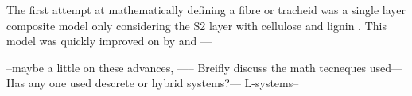  The first attempt at mathematically defining a fibre or tracheid was a single layer composite model only considering the S2 layer with cellulose and lignin \cite{Barber_1964}. This model was quickly improved on by \cite{mark1967cell} and \cite{Cave_1968}--- 
 
 
 --maybe a little on these advances, ----- Breifly discuss the math
tecneques used---Has any one used descrete or hybrid systems?--- L-systems--